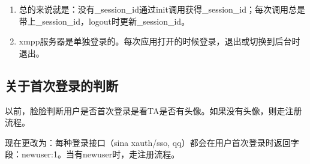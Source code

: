 \begin{enumerate}
\begin{enumerate}
\end{enumerate}

\item 总的来说就是：没有\_session\_id通过init调用获得\_session\_id；每次调用总是带上\_session\_id，logout时更新\_session\_id。


\item xmpp服务器是单独登录的。每次应用打开的时候登录，退出或切换到后台时退出。


\end{enumerate}


\subsection{关于首次登录的判断}
以前，脸脸判断用户是否首次登录是看TA是否有头像。如果没有头像，则走注册流程。

现在更改为：每种登录接口（sina xauth/sso, qq）都会在用户首次登录时返回字段：{newuser:1}。当有newuser时，走注册流程。
